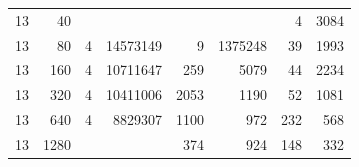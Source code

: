 \begin{table}[p]
\begin{minipage}[c]{0.49\textwidth}
\begin{tabular}{|rr|rr|rr|rr|}
\num{13} &   \num{40} &         &                &            &               &   \num{4} & \num{3084} \\
\num{13} &   \num{80} & \num{4} & \num{14573149} &    \num{9} & \num{1375248} &  \num{39} & \num{1993} \\
\num{13} &  \num{160} & \num{4} & \num{10711647} &  \num{259} &    \num{5079} &  \num{44} & \num{2234} \\
\num{13} &  \num{320} & \num{4} & \num{10411006} & \num{2053} &    \num{1190} &  \num{52} & \num{1081} \\
\num{13} &  \num{640} & \num{4} &  \num{8829307} & \num{1100} &     \num{972} & \num{232} &  \num{568} \\
\num{13} & \num{1280} &         &                &  \num{374} &     \num{924} & \num{148} &  \num{332} \\
\hline
\end{tabular}
\label{tab:patterns_locate_apm_edit}
\end{minipage}
\vspace*{\fill}
\end{table}
